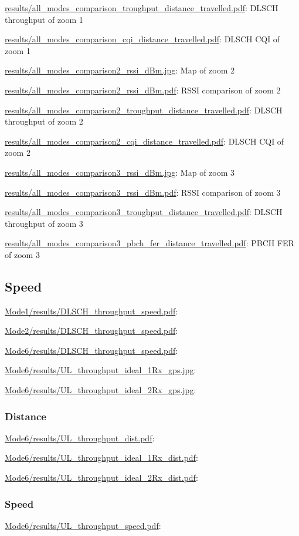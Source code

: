 \documentclass[a4paper,10pt]{article}
\newcommand{\printfile}[2][]{
 \begin{minipage}{8cm}
  \centering
  \url{#2}: #1

 \end{minipage}
}
\begin{document}
\printfile[DLSCH throughput of zoom 1]{results/all_modes_comparison_troughput_distance_travelled.pdf}
\printfile[DLSCH CQI of zoom 1]{results/all_modes_comparison_cqi_distance_travelled.pdf}

\printfile[Map of zoom 2]{results/all_modes_comparison2_rssi_dBm.jpg}
\printfile[RSSI comparison of zoom 2]{results/all_modes_comparison2_rssi_dBm.pdf}

\printfile[DLSCH throughput of zoom 2]{results/all_modes_comparison2_troughput_distance_travelled.pdf}
\printfile[DLSCH CQI of zoom 2]{results/all_modes_comparison2_cqi_distance_travelled.pdf}

\printfile[Map of zoom 3]{results/all_modes_comparison3_rssi_dBm.jpg}
\printfile[RSSI comparison of zoom 3]{results/all_modes_comparison3_rssi_dBm.pdf}

\printfile[DLSCH throughput of zoom 3]{results/all_modes_comparison3_troughput_distance_travelled.pdf}
\printfile[PBCH FER of zoom 3]{results/all_modes_comparison3_pbch_fer_distance_travelled.pdf}

\subsection{Speed}

\printfile{Mode1/results/DLSCH_throughput_speed.pdf}
\printfile{Mode2/results/DLSCH_throughput_speed.pdf}

\printfile{Mode6/results/DLSCH_throughput_speed.pdf}

\printfile{Mode6/results/UL_throughput_ideal_1Rx_gps.jpg}
\printfile{Mode6/results/UL_throughput_ideal_2Rx_gps.jpg}

\subsubsection{Distance}
\printfile{Mode6/results/UL_throughput_dist.pdf}
\printfile{Mode6/results/UL_throughput_ideal_1Rx_dist.pdf}
\printfile{Mode6/results/UL_throughput_ideal_2Rx_dist.pdf}

\subsubsection{Speed}
\printfile{Mode6/results/UL_throughput_speed.pdf}
\end{document}
